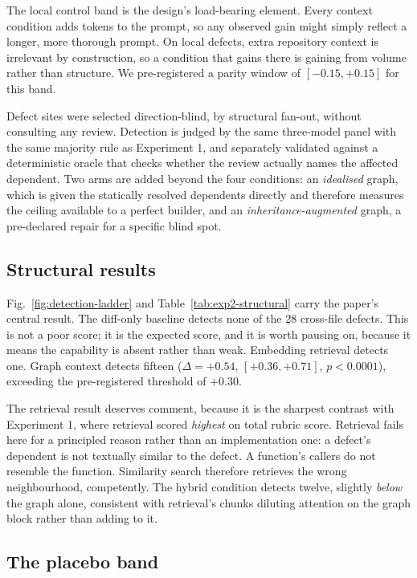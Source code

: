 \documentclass[conference]{IEEEtran}
\begin{document}
The local control band is the design's load-bearing element. Every context
condition adds tokens to the prompt, so any observed gain might simply
reflect a longer, more thorough prompt. On local defects, extra repository
context is irrelevant by construction, so a condition that gains there is
gaining from volume rather than structure. We pre-registered a parity window
of $[-0.15, +0.15]$ for this band.

Defect sites were selected direction-blind, by structural fan-out, without
consulting any review. Detection is judged by the same three-model panel with
the same majority rule as Experiment 1, and separately validated against a
deterministic oracle that checks whether the review actually names the
affected dependent. Two arms are added beyond the four conditions: an
\emph{idealised} graph, which is given the statically resolved dependents
directly and therefore measures the ceiling available to a perfect builder,
and an \emph{inheritance-augmented} graph, a pre-declared repair for a
specific blind spot.

\subsection{Structural results}



Fig.~\ref{fig:detection-ladder} and Table~\ref{tab:exp2-structural} carry the
paper's central result. The diff-only
baseline detects none of the 28 cross-file defects. This is not a poor score;
it is the expected score, and it is worth pausing on, because it means the
capability is absent rather than weak. Embedding retrieval detects one. Graph
context detects fifteen ($\Delta = +0.54$, $[+0.36, +0.71]$, $p<0.0001$),
exceeding the pre-registered threshold of $+0.30$.

The retrieval result deserves comment, because it is the sharpest contrast
with Experiment 1, where retrieval scored \emph{highest} on total rubric
score. Retrieval fails here for a principled reason rather than an
implementation one: a defect's dependent is not textually similar to the
defect. A function's callers do not resemble the function. Similarity search
therefore retrieves the wrong neighbourhood, competently. The hybrid
condition detects twelve, slightly \emph{below} the graph alone, consistent
with retrieval's chunks diluting attention on the graph block rather than
adding to it.

\subsection{The placebo band}

\end{document}
